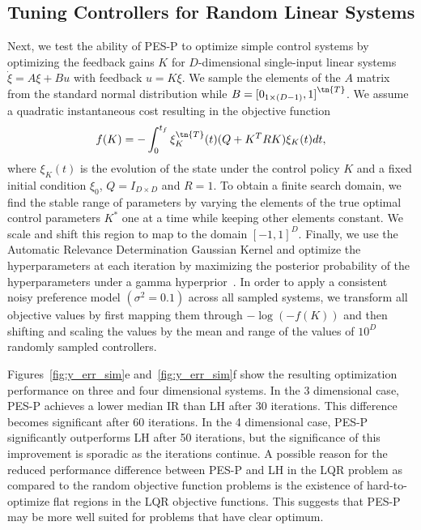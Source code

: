 \subsection{Tuning Controllers for Random Linear Systems}
Next, we test the ability of PES-P to optimize simple control systems by
optimizing the feedback gains $K$ for $D$-dimensional single-input linear
systems $\dot{\xi} = A \xi + Bu$ with feedback $u = K \xi$. We sample the
elements of the $A$ matrix from the standard normal distribution while $B =
{[0_{1 \times (D-1)}, 1]}^\tn{T}$. We assume a quadratic instantaneous cost
resulting in the objective function
\begin{equation}
    f(K) = - \int_0^{t_f} \xi_K^\tn{T}(t) (Q + K^T R K) \xi_K(t) dt,
\end{equation}
where $\xi_K(t)$ is the evolution of the state under the control policy $K$ and
a fixed initial condition $\xi_0$, $Q = I_{D \times D}$ and $R = 1$. To obtain a
finite search domain, we find the stable range of parameters by varying the
elements of the true optimal control parameters $K^*$ one at a time while
keeping other elements constant. We scale and shift this region to map to the
domain ${[-1, 1]}^D$. Finally, we use the Automatic Relevance Determination
Gaussian Kernel and optimize the hyperparameters at each iteration by maximizing
the posterior probability of the hyperparameters under a gamma
hyperprior~\citep{chu2005preference,
williams2006gaussian}. In order to apply a consistent noisy preference model
$(\sigma^2 = 0.1)$ across all sampled systems, we transform all objective values
by first mapping them through $-\log(-f(K))$ and then shifting and scaling the
values by the mean and range of the values of $10^D$ randomly sampled
controllers. 

Figures~\ref{fig:y_err_sim}e and~\ref{fig:y_err_sim}f show the resulting
optimization performance on three and four dimensional systems. In the 3
dimensional case, PES-P achieves a lower median IR than LH after 30 iterations.
This difference becomes significant after 60 iterations. In the 4 dimensional
case, PES-P significantly outperforms LH after 50 iterations, but the
significance of this improvement is sporadic as the iterations continue. A
possible reason for the reduced performance difference between PES-P and LH in
the LQR problem as compared to the random objective function problems is the
existence of hard-to-optimize flat regions in the LQR objective functions. This
suggests that PES-P may be more well suited for problems that have clear
optimum.
